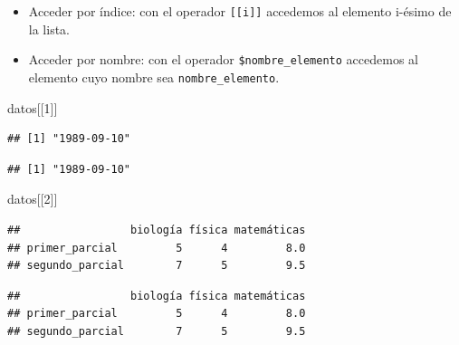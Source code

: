 \documentclass[11pt,]{book}
\newenvironment{Shaded}{\begin{snugshade}}{\end{snugshade}}
\newcommand{\DecValTok}[1]{\textcolor[rgb]{0.06,0.06,0.06}{#1}}
\newcommand{\NormalTok}[1]{#1}
\newcommand{\OperatorTok}[1]{\textcolor[rgb]{0.43,0.43,0.43}{\textbf{#1}}}
\begin{document}
\begin{itemize}
\item
  Acceder por índice: con el operador \texttt{{[}{[}i{]}{]}} accedemos al elemento i-ésimo de la lista.
\item
  Acceder por nombre: con el operador \texttt{\$nombre\_elemento} accedemos al elemento cuyo nombre sea \texttt{nombre\_elemento}.
\end{itemize}

\begin{Shaded}
\begin{Highlighting}[]
\NormalTok{datos[[}\DecValTok{1}\NormalTok{]]}
\end{Highlighting}
\end{Shaded}

\begin{verbatim}
## [1] "1989-09-10"
\end{verbatim}

\begin{Shaded}
\end{Shaded}

\begin{verbatim}
## [1] "1989-09-10"
\end{verbatim}

\begin{Shaded}
\begin{Highlighting}[]
\NormalTok{datos[[}\DecValTok{2}\NormalTok{]]}
\end{Highlighting}
\end{Shaded}

\begin{verbatim}
##                 biología física matemáticas
## primer_parcial         5      4         8.0
## segundo_parcial        7      5         9.5
\end{verbatim}

\begin{Shaded}
\end{Shaded}

\begin{verbatim}
##                 biología física matemáticas
## primer_parcial         5      4         8.0
## segundo_parcial        7      5         9.5
\end{verbatim}
\end{document}
